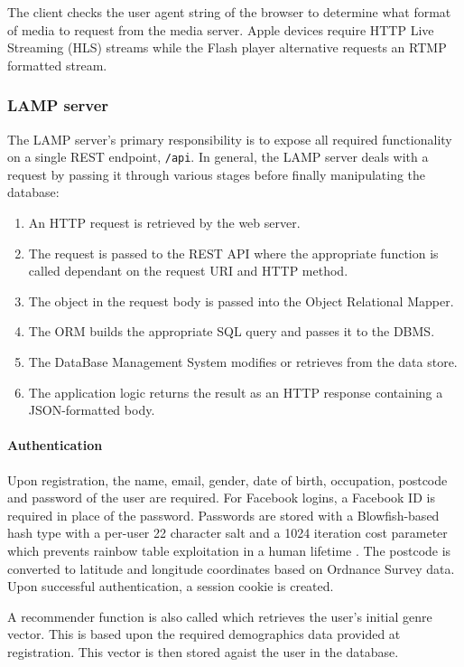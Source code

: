 The client checks the user agent string of the browser to determine what format of media to request from the media server. Apple devices require HTTP Live Streaming (HLS) streams while the Flash player alternative requests an RTMP formatted stream.

\subsubsection{LAMP server}

The LAMP server's primary responsibility is to expose all required functionality on a single REST endpoint, \texttt{/api}. In general, the LAMP server deals with a request by passing it through various stages before finally manipulating the database:

\begin{enumerate}
	\item An HTTP request is retrieved by the web server.
	\item The request is passed to the REST API where the appropriate function is called dependant on the request URI and HTTP method.
	\item The object in the request body is passed into the Object Relational Mapper.
	\item The ORM builds the appropriate SQL query and passes it to the DBMS.
	\item The DataBase Management System modifies or retrieves from the data store.
	\item The application logic returns the result as an HTTP response containing a JSON-formatted body.
\end{enumerate}

\paragraph{Authentication}

Upon registration, the name, email, gender, date of birth, occupation, postcode and password of the user are required. For Facebook logins, a Facebook ID is required in place of the password. Passwords are stored with a Blowfish-based hash type with a per-user 22 character salt and a 1024 iteration cost parameter which prevents rainbow table exploitation in a human lifetime \citep{hashing}. The postcode is converted to latitude and longitude coordinates based on Ordnance Survey data. Upon successful authentication, a session cookie is created.

A recommender function is also called which retrieves the user's initial genre vector. This is based upon the required demographics data provided at registration. This vector is then stored agaist the user in the database.

